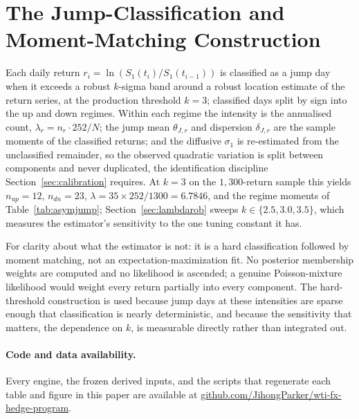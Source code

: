 \documentclass[11pt,a4paper]{article}
\begin{document}
\section{The Jump-Classification and Moment-Matching Construction}
\label{app:em}

Each daily return $r_i=\ln(S_1(t_i)/S_1(t_{i-1}))$ is classified as a jump day when it exceeds a robust $k$-sigma band around a robust location estimate of the return series, at the production threshold $k=3$; classified days split by sign into the up and down regimes. Within each regime the intensity is the annualised count, $\lambda_r=n_r\cdot252/N$; the jump mean $\theta_{J,r}$ and dispersion $\delta_{J,r}$ are the sample moments of the classified returns; and the diffusive $\sigma_1$ is re-estimated from the unclassified remainder, so the observed quadratic variation is split between components and never duplicated, the identification discipline Section~\ref{sec:calibration} requires. At $k=3$ on the $1{,}300$-return sample this yields $n_{up}=12$, $n_{dn}=23$, $\lambda=35\times252/1300=6.7846$, and the regime moments of Table~\ref{tab:asymjump}; Section~\ref{sec:lambdarob} sweeps $k\in\{2.5,3.0,3.5\}$, which measures the estimator's sensitivity to the one tuning constant it has.

For clarity about what the estimator is not: it is a hard classification followed by moment matching, not an expectation-maximization fit. No posterior membership weights are computed and no likelihood is ascended; a genuine Poisson-mixture likelihood would weight every return partially into every component. The hard-threshold construction is used because jump days at these intensities are sparse enough that classification is nearly deterministic, and because the sensitivity that matters, the dependence on $k$, is measurable directly rather than integrated out.

\paragraph{Code and data availability.} Every engine, the frozen derived inputs, and the scripts that regenerate each table and figure in this paper are available at \url{github.com/JihongParker/wti-fx-hedge-program}.
\end{document}
